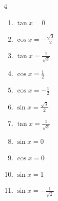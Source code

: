 \begin{multicols}{4}
\begin{enumerate}
        \phantom{$\displaystyle x = \pi$}

  \item $\displaystyle \tan{x}  = 0$

        \phantom{$\displaystyle x = 0 , \pi$}

  \item $\displaystyle \cos{x}  = -\frac{\sqrt{3}}{2}$


  \item $\displaystyle \tan{x}  = \frac{1}{\sqrt{3}}$


  \item $\displaystyle \cos{x}  = \frac{1}{2}$


  \item $\displaystyle \cos{x}  = -\frac{1}{2}$


  \item $\displaystyle \sin{x}  = \frac{\sqrt{3}}{2}$


  \item $\displaystyle \tan{x}  = \frac{1}{\sqrt{3}}$


  \item $\displaystyle \sin{x}  = 0$

        \phantom{$\displaystyle x = 0 , \pi$}

  \item $\displaystyle \cos{x}  = 0$


\columnbreak %

  \item $\displaystyle \sin{x}  = 1$


  \item $\displaystyle \sin{x}  = -\frac{1}{\sqrt{2}}$



\end{enumerate}
\end{multicols}
